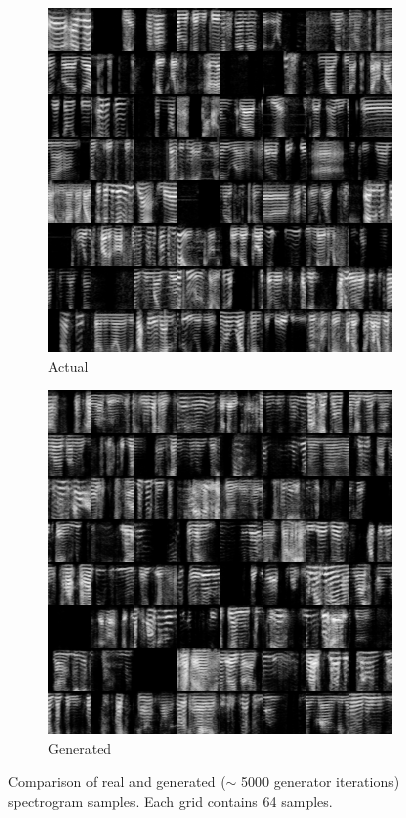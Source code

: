 \begin{figure}[h]
    \centering
    \begin{subfigure}[b]{0.4\textwidth}
        \includegraphics[width=\textwidth]{./fig/samples_groundtruth.png}
        \caption{Actual}
        \label{fig:samples_real}
    \end{subfigure}
    \qquad
    \begin{subfigure}[b]{0.4\textwidth}
        \includegraphics[width=\textwidth]{./fig/samples_5419.png}
        \caption{Generated}
        \label{fig:samples_fake}
    \end{subfigure}
    \caption{Comparison of real and generated ($\sim$ 5000 generator iterations) spectrogram samples. Each grid contains 64 samples.}
    \label{fig:samples_comparison}
\end{figure}

